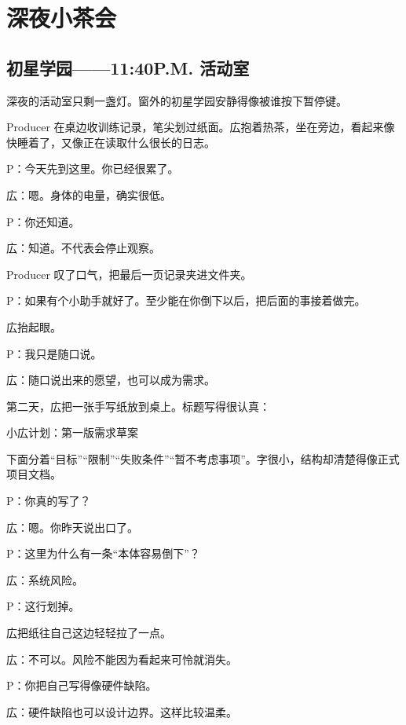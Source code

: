 \chapter{深夜小茶会}

\section*{初星学园——11:40P.M. 活动室}
{}


深夜的活动室只剩一盏灯。窗外的初星学园安静得像被谁按下暂停键。

Producer 在桌边收训练记录，笔尖划过纸面。広抱着热茶，坐在旁边，看起来像快睡着了，又像正在读取什么很长的日志。

P：今天先到这里。你已经很累了。

広：嗯。身体的电量，确实很低。

P：你还知道。

広：知道。不代表会停止观察。

Producer 叹了口气，把最后一页记录夹进文件夹。

P：如果有个小助手就好了。至少能在你倒下以后，把后面的事接着做完。

広抬起眼。

P：我只是随口说。

広：随口说出来的愿望，也可以成为需求。

第二天，広把一张手写纸放到桌上。标题写得很认真：

\begin{center}
小広计划：第一版需求草案
\end{center}

下面分着“目标”“限制”“失败条件”“暂不考虑事项”。字很小，结构却清楚得像正式项目文档。

P：你真的写了？

広：嗯。你昨天说出口了。

P：这里为什么有一条“本体容易倒下”？

広：系统风险。

P：这行划掉。

広把纸往自己这边轻轻拉了一点。

広：不可以。风险不能因为看起来可怜就消失。

P：你把自己写得像硬件缺陷。

広：硬件缺陷也可以设计边界。这样比较温柔。

